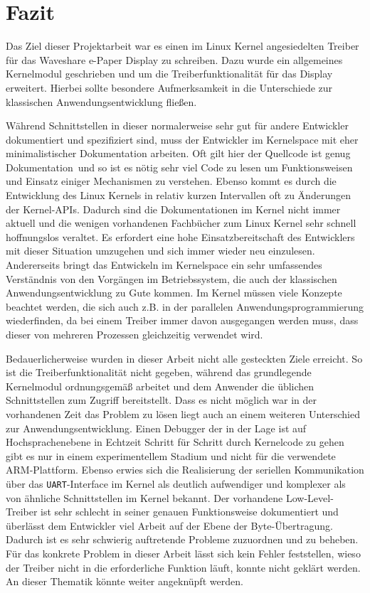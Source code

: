 \chapter{Fazit}
Das Ziel dieser Projektarbeit war es einen im Linux Kernel angesiedelten Treiber für das Waveshare e-Paper Display zu schreiben. Dazu wurde ein allgemeines Kernelmodul geschrieben und um die Treiberfunktionalität für das Display erweitert.
Hierbei sollte besondere Aufmerksamkeit in die Unterschiede zur klassischen Anwendungsentwicklung fließen. 

Während Schnittstellen in dieser normalerweise sehr gut für andere Entwickler dokumentiert und spezifiziert sind, muss der Entwickler im Kernelspace mit eher minimalistischer Dokumentation arbeiten. Oft gilt hier \glqq der Quellcode ist genug Dokumentation\grqq~und so ist es nötig sehr viel Code zu lesen um Funktionsweisen und Einsatz einiger Mechanismen zu verstehen. 
Ebenso kommt es durch die Entwicklung des Linux Kernels in relativ kurzen Intervallen oft zu Änderungen der Kernel-APIs. Dadurch sind die Dokumentationen im Kernel nicht immer aktuell und die wenigen vorhandenen Fachbücher zum Linux Kernel sehr schnell hoffnungslos veraltet. Es erfordert eine hohe Einsatzbereitschaft des Entwicklers mit dieser Situation umzugehen und sich immer wieder neu einzulesen. Andererseits bringt das Entwickeln im Kernelspace ein sehr umfassendes Verständnis von den Vorgängen im Betriebssystem, die auch der klassischen Anwendungsentwicklung zu Gute kommen. Im Kernel müssen viele Konzepte beachtet werden, die sich auch z.B. in der parallelen Anwendungsprogrammierung wiederfinden, da bei einem Treiber immer davon ausgegangen werden muss, dass dieser von mehreren Prozessen gleichzeitig verwendet wird.  

Bedauerlicherweise wurden in dieser Arbeit nicht alle gesteckten Ziele erreicht. So ist die Treiberfunktionalität nicht gegeben, während das grundlegende Kernelmodul ordnungsgemäß arbeitet und dem Anwender die üblichen Schnittstellen zum Zugriff bereitstellt. Dass es nicht möglich war in der vorhandenen Zeit das Problem zu lösen liegt auch an einem weiteren Unterschied zur Anwendungsentwicklung. Einen Debugger der in der Lage ist auf Hochsprachenebene in Echtzeit Schritt für Schritt durch Kernelcode zu gehen gibt es nur in einem experimentellem Stadium und nicht für die verwendete ARM-Plattform. Ebenso erwies sich die Realisierung der seriellen Kommunikation über das \texttt{UART}-Interface im Kernel als deutlich aufwendiger und komplexer als von ähnliche Schnittstellen im Kernel bekannt. Der vorhandene Low-Level-Treiber ist sehr schlecht in seiner genauen Funktionsweise dokumentiert und überlässt dem Entwickler viel Arbeit auf der Ebene der Byte-Übertragung. Dadurch ist es sehr schwierig auftretende Probleme zuzuordnen und zu beheben. Für das konkrete Problem in dieser Arbeit lässt sich kein Fehler feststellen, wieso der Treiber nicht in die erforderliche Funktion läuft, konnte nicht geklärt werden. An dieser Thematik könnte weiter angeknüpft werden. 

